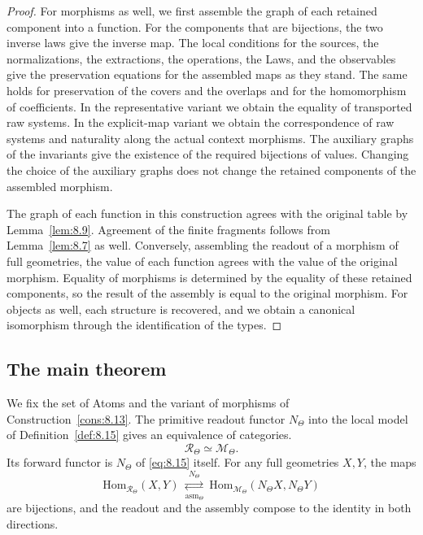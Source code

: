 \begin{proof}
For morphisms as well, we first assemble the graph of each retained component into a function.
For the components that are bijections, the two inverse laws give the inverse map.
The local conditions for the sources, the normalizations, the extractions, the operations, the
Laws, and the observables give the preservation equations for the assembled maps as they
stand.
The same holds for preservation of the covers and the overlaps and for the homomorphism of
coefficients.
In the representative variant we obtain the equality of transported raw systems.
In the explicit-map variant we obtain the correspondence of raw systems and naturality along
the actual context morphisms.
The auxiliary graphs of the invariants give the existence of the required bijections of
values.
Changing the choice of the auxiliary graphs does not change the retained components of the
assembled morphism.

The graph of each function in this construction agrees with the original table by
Lemma~\ref{lem:8.9}.
Agreement of the finite fragments follows from Lemma~\ref{lem:8.7} as well.
Conversely, assembling the readout of a morphism of full geometries, the value of each
function agrees with the value of the original morphism.
Equality of morphisms is determined by the equality of these retained components, so the
result of the assembly is equal to the original morphism.
For objects as well, each structure is recovered, and we obtain a canonical isomorphism
through the identification of the types.

\end{proof}

\subsection*{The main theorem}

\begin{theorem}\label{thm:8.18}

We fix the set of Atoms and the variant of morphisms of Construction~\ref{cons:8.13}.
The primitive readout functor $N_\Theta$ into the local model of Definition~\ref{def:8.15}
gives an equivalence of categories.
\begin{equation*}
\mathcal{R}_\Theta\simeq\mathcal{M}_\Theta.
\tag{8.16}\label{eq:8.16}
\end{equation*}
Its forward functor is $N_\Theta$ of \eqref{eq:8.15} itself.
For any full geometries $X,Y$, the maps
\begin{equation*}
\mathrm{Hom}_{\mathcal{R}_\Theta}(X,Y)
\ \underset{\mathrm{asm}_\Theta}
{\overset{N_\Theta}{\rightleftarrows}}\
\mathrm{Hom}_{\mathcal{M}_\Theta}(N_\Theta X,N_\Theta Y)
\tag{8.17}\label{eq:8.17}
\end{equation*}
are bijections, and the readout and the assembly compose to the identity in both directions.

\end{theorem}

